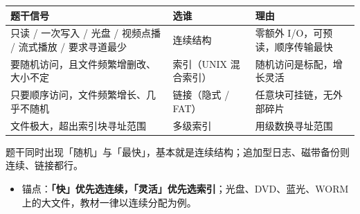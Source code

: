 \documentclass[11pt,a4paper]{ctexart}
\begin{document}


\begin{center}\small
\begin{tabularx}{\linewidth}{@{}>{\raggedright\arraybackslash}X>{\raggedright\arraybackslash}X>{\raggedright\arraybackslash}X@{}}
\toprule
题干信号 & 选谁 & 理由 \\
\midrule
只读 / 一次写入 / 光盘 / 视频点播 / 流式播放 / 要求寻道最少 & 连续结构 & 零额外 I/O，可预读，顺序传输最快 \\
要随机访问，且文件频繁增删改、大小不定 & 索引（UNIX 混合索引） & 随机访问是标配，增长灵活 \\
只要顺序访问，文件频繁增长、几乎不随机 & 链接（隐式 / FAT） & 任意块可挂链，无外部碎片 \\
文件极大，超出索引块寻址范围 & 多级索引 & 用级数换寻址范围 \\
\bottomrule
\end{tabularx}
\end{center}

题干同时出现「随机」与「最快」，基本就是连续结构；追加型日志、磁带备份则连续、链接都行。





\begin{itemize}

\item 锚点：\textbf{「快」优先选连续，「灵活」优先选索引}；光盘、DVD、蓝光、WORM 上的大文件，教材一律以连续分配为例。

\end{itemize}
\end{document}
